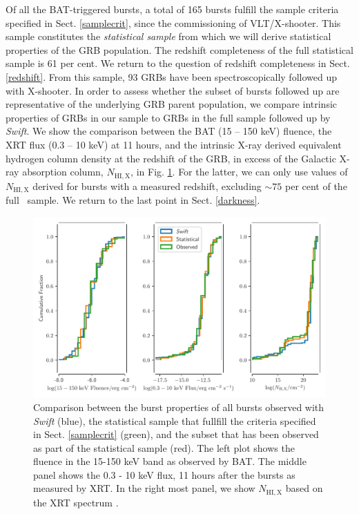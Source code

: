 \documentclass[longauth]{aa}    %
\begin{document}
Of all the BAT-triggered bursts, a total of 165 bursts fulfill the sample
criteria specified in Sect. \ref{samplecrit}, since the commissioning of
VLT/X-shooter. This sample constitutes the \textit{statistical sample} from
which we will derive statistical properties of the GRB population. The redshift
completeness of the full statistical sample is 61 per cent. We return to the
question of redshift completeness in Sect. \ref{redshift}. From this sample, 93
GRBs have been spectroscopically followed up with X-shooter. In order to assess
whether the subset of bursts followed up are representative of the underlying
GRB parent population, we compare intrinsic properties of GRBs in our sample to
GRBs in the full sample followed up by \textit{Swift}. We show the comparison
between the BAT (15 -- 150 keV) fluence, the XRT flux (0.3 -- 10 keV) at 11
hours, and the intrinsic X-ray derived equivalent hydrogen column density at the
redshift of the GRB, in excess of the Galactic X-ray absorption column,
$N_{\mathrm{HI,X}}$, in Fig. \ref{fig:swift_complete}. For the latter, we can
only use values of $N_{\mathrm{HI,X}}$ derived for bursts with a measured
redshift, excluding $\sim 75$ per cent of the full \swift~sample. We return to
the last point in Sect. \ref{darkness}.


\begin{figure}
	\centerline{\includegraphics[width=\linewidth]{figures/completeness_BAT.pdf}}
\caption{Comparison between the burst properties of all bursts observed with
	\textit{Swift} (blue), the statistical sample that fullfill the criteria
	specified in Sect. \ref{samplecrit} (green), and the subset that has been
	observed as part of the statistical sample (red). The left plot shows the
	fluence in the 15-150 keV band as observed by BAT. The middle panel shows the 0.3 - 10
	keV flux, 11 hours after the bursts as measured by XRT. In the right most
	panel, we show $N_{\mathrm{HI,X}}$ based on the XRT spectrum
	\citep{Evans2009}.} \label{fig:swift_complete}
\end{figure}
\end{document}
